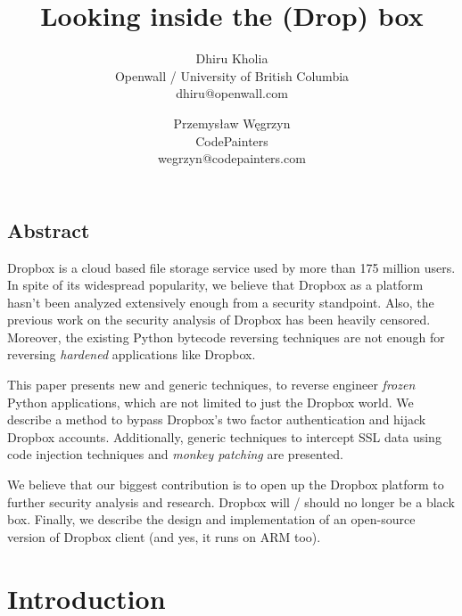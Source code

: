 \documentclass[letterpaper,twocolumn,10pt]{article}
\begin{document}
\date{}

\title{\Large \bf Looking inside the (Drop) box}

\author{ {\rm Dhiru Kholia}\\ Openwall / University of British Columbia \\
{\rm dhiru@openwall.com} \and {\rm Przemysław Węgrzyn}\\ CodePainters \\ {\rm
wegrzyn@codepainters.com} }

\maketitle

\pagestyle{empty}

\subsection*{Abstract}

Dropbox is a cloud based file storage service used by more than 175 million
users. In spite of its widespread popularity, we believe that Dropbox as a
platform hasn't been analyzed extensively enough from a security standpoint.
Also, the previous work on the security analysis of Dropbox has been heavily
censored. Moreover, the existing Python bytecode reversing techniques are not
enough for reversing \emph{hardened} applications like Dropbox.

This paper presents new and generic techniques, to reverse engineer
\emph{frozen} Python applications, which are not limited to just the Dropbox
world. We describe a method to bypass Dropbox's two factor authentication and
hijack Dropbox accounts. Additionally, generic techniques to intercept SSL data
using code injection techniques and \emph{monkey patching} are presented.

We believe that our biggest contribution is to open up the Dropbox platform to
further security analysis and research. Dropbox will / should no longer be a
black box. Finally, we describe the design and implementation of an open-source
version of Dropbox client (and yes, it runs on ARM too).

\section{Introduction}
\end{document}
